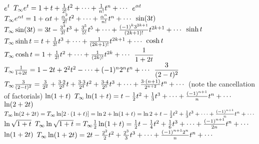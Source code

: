 \begin{multicols}{2}
\problem $\displaystyle e^t $ %
\answer %
$T_{\infty} e^t = 1+ t + \frac1{2!}t^2+\cdots+\frac1{n!}t^n+\cdots$
\endanswer
\problem $\displaystyle e^{\alpha t} $ %
\answer %
$T_{\infty} e^{\alpha t} = 1+\alpha t +
\frac{\alpha^2}{2!}t^2+\cdots+\frac{\alpha^n}{n!}t^n+\cdots$
\endanswer
\problem $\displaystyle \sin(3t) $ %
\answer %
$T_{\infty} \sin(3t) = 3t-\frac{3^3}{3!}t^3 +\frac{3^5}{5!}t^5+\cdots
+\frac{(-1)^k3^{2k+1}}{(2k+1)!}t^{2k+1}+\cdots$
\endanswer
\problem $\displaystyle \sinh t $ %
\answer %
$T_{\infty} \sinh t = t+\frac1{3!}t^3+\cdots+\frac1{(2k+1)!}t^{2k+1}+\cdots$
\endanswer
\problem $\displaystyle \cosh t $ %
\answer %
$T_{\infty} \cosh t = 1+\frac1{2!}t^2+\cdots+\frac1{(2k)!}t^{2k}+\cdots$
\endanswer
\problem $\displaystyle \frac1{1+2t} $ %
\answer %
$T_{\infty} \frac1{1+2t} = 1-2t+2^2t^2-\cdots+(-1)^n2^nt^n+\cdots$
\endanswer
\problem $\displaystyle \frac3{(2-t)^2} $ %
\answer %
$T_{\infty} \frac3{(2-t)^2} = \frac3{2^2} +\frac{3\cdot2}{2^3}t +
\frac{3\cdot3}{2^4}t^2+\frac{3\cdot4}{2^5}t^3
+\cdots+\frac{3\cdot(n+1)}{2^{n+2}}t^n+\cdots$ (note the cancellation
of factorials)
\endanswer
\problem $\displaystyle \ln (1+t) $ %
\answer %
$T_{\infty} \ln(1+t) =
t-\frac12t^2+\frac13t^3+\cdots+\frac{(-1)^{n+1}}{n}t^n+\cdots$
\endanswer
\problem $\displaystyle \ln(2+2t) $ %
\answer %
$T_{\infty} \ln(2+2t) =T_{\infty} \ln[ 2\cdot(1+t) ] = \ln2+\ln(1+t) = \ln2
+t-\frac12t^2+\frac13t^3+\cdots+\frac{(-1)^{n+1}}{n}t^n+\cdots $
\endanswer
\problem $\displaystyle \ln \sqrt{1+t} $ %
\answer %
$T_{\infty} \ln\sqrt{1+t} = T_{\infty}\frac12\ln(1+t) =
\frac12t-\frac14t^2+\frac16t^3+\cdots+\frac{(-1)^{n+1}}{2n}t^n+\cdots
$
\endanswer
\problem $\displaystyle \ln (1+2t)$ %
\answer %
$T_{\infty} \ln(1+2t) =
2t-\frac{2^2}2t^2+\frac{2^3}3t^3+\cdots+\frac{(-1)^{n+1}2^n}{n}t^n+\cdots
$
\endanswer



\end{multicols}
